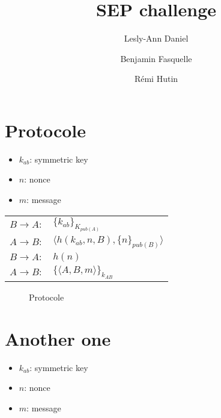 \documentclass[10pt,a4paper]{article}
\author{Lesly-Ann Daniel \and Benjamin Fasquelle \and Rémi Hutin}
\title{SEP challenge}
\begin{document}
\maketitle


\section{Protocole}

\begin{itemize}
\item $k_{ab}$: symmetric key
\item $n$: nonce
\item $m$: message
\end{itemize}

\begin{table}[!h]
\centering
\begin{tabular}{ll}
$B \rightarrow A:$ & $\{k_{ab}\}_{K_{pub(A)}}$ \\
$A \rightarrow B:$ & $\langle h(k_{ab}, n, B), \{n\}_{pub(B)} \rangle $\\
$B \rightarrow A:$ & $h(n)$\\
$A \rightarrow B:$ & $\{ \langle A, B, m \rangle \}_{k_{AB}}$
\end{tabular}
\end{table}


\begin{figure}[!ht]
\centering
\begin{msc}{Protocole}
  \nextlevel
  \nextlevel
  \nextlevel
  \nextlevel
  \nextlevel
\end{msc}
\end{figure}




\clearpage
\section{Another one}

\begin{itemize}
\item $k_{ab}$: symmetric key
\item $n$: nonce
\item $m$: message
\end{itemize}
\end{document}
